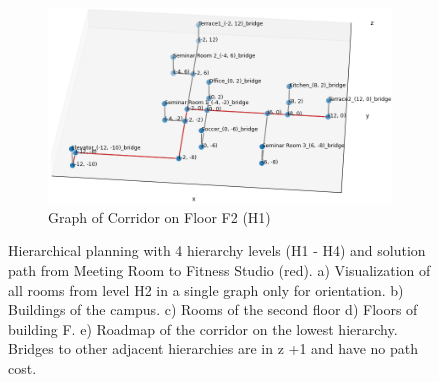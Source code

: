 \begin{figure}[h]
\begin{subfigure}{.8\textwidth}
      \includegraphics[width=\textwidth]{figures/40_concept/ltc_graph_corridor.png}
      \caption{Graph of Corridor on Floor F2 (H1)}
    \end{subfigure}
    \caption[Hierarchical path planning with 4 hierarchy levels]{Hierarchical planning with 4 hierarchy levels (H1 - H4) and solution path from Meeting Room to Fitness Studio (red). a) Visualization of all rooms from level H2 in a single graph only for orientation. b) Buildings of the campus. c) Rooms of the second floor d) Floors of building F. e) Roadmap of the corridor on the lowest hierarchy. Bridges to other adjacent hierarchies are in z +1 and have no path cost.}
    \label{fig:hierarchical_planning}
\end{figure}

